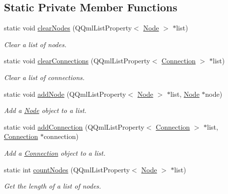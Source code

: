 \subsection*{Static Private Member Functions}
\begin{DoxyCompactItemize}
\item 
static void \mbox{\hyperlink{classRoom_a00e39d49aaabdee84019b1d9091ced50}{clear\+Nodes}} (Q\+Qml\+List\+Property$<$ \mbox{\hyperlink{classNode}{Node}} $>$ $\ast$list)
\begin{DoxyCompactList}\small\item\em Clear a list of nodes. \end{DoxyCompactList}\item 
static void \mbox{\hyperlink{classRoom_a62765f1f397f932e6d2aa7ed00e0deff}{clear\+Connections}} (Q\+Qml\+List\+Property$<$ \mbox{\hyperlink{classConnection}{Connection}} $>$ $\ast$list)
\begin{DoxyCompactList}\small\item\em Clear a list of connections. \end{DoxyCompactList}\item 
static void \mbox{\hyperlink{classRoom_a98d12ac4c68d68775b1e429bc3ad31cf}{add\+Node}} (Q\+Qml\+List\+Property$<$ \mbox{\hyperlink{classNode}{Node}} $>$ $\ast$list, \mbox{\hyperlink{classNode}{Node}} $\ast$node)
\begin{DoxyCompactList}\small\item\em Add a \mbox{\hyperlink{classNode}{Node}} object to a list. \end{DoxyCompactList}\item 
static void \mbox{\hyperlink{classRoom_a2ebf6e0a7870458f767a15a458e7e033}{add\+Connection}} (Q\+Qml\+List\+Property$<$ \mbox{\hyperlink{classConnection}{Connection}} $>$ $\ast$list, \mbox{\hyperlink{classConnection}{Connection}} $\ast$connection)
\begin{DoxyCompactList}\small\item\em Add a \mbox{\hyperlink{classConnection}{Connection}} object to a list. \end{DoxyCompactList}\item 
static int \mbox{\hyperlink{classRoom_a94547b2123257446da232b4a045a09ff}{count\+Nodes}} (Q\+Qml\+List\+Property$<$ \mbox{\hyperlink{classNode}{Node}} $>$ $\ast$list)
\begin{DoxyCompactList}\small\item\em Get the length of a list of nodes. \end{DoxyCompactList}\item 

\end{DoxyCompactItemize}
